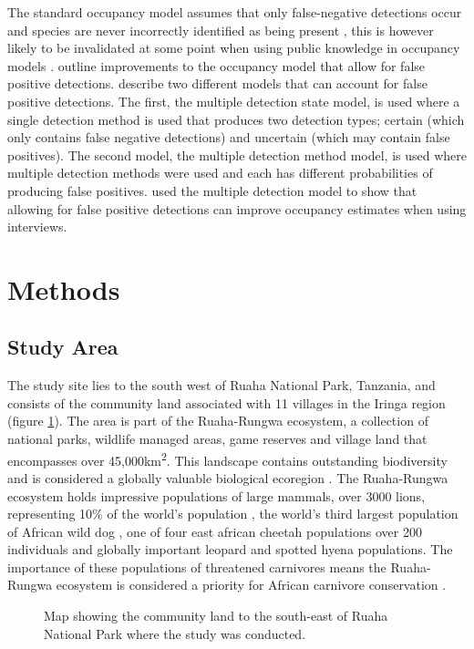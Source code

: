 The standard occupancy model assumes that only false-negative detections occur and species are never incorrectly identified as being present \cite{mackenzie2006occupancy}, this is however likely to be invalidated at some point when using public knowledge in occupancy models \cite{Pillay2014}. \citet{States2011} outline improvements to the occupancy model that allow for false positive detections. \citet{States2011} describe two different models that can account for false positive detections. The first, the multiple detection state model, is used where a single detection method is used that produces two detection types; certain (which only contains false negative detections) and uncertain (which may contain false positives). The second model, the multiple detection method model, is used where multiple detection methods were used and each has different probabilities of producing false positives. \cite{Pillay2014} used the multiple detection model to show that allowing for false positive detections can improve occupancy estimates when using interviews.

\section*{Methods}
\subsection*{Study Area}
The study site lies to the south west of Ruaha National Park, Tanzania, and consists of the community land associated with 11 villages in the Iringa region (figure \ref{fig:area_map}). The area is part of the Ruaha-Rungwa ecosystem, a collection of national parks, wildlife managed areas, game reserves and village land that encompasses over 45,000km\textsuperscript{2}. This landscape contains outstanding biodiversity and is considered a globally valuable biological ecoregion \cite{Olson1998}. The Ruaha-Rungwa ecosystem holds impressive populations of large mammals, over 3000 lions, representing 10\% of the world's population \cite{Riggio2013}, the world's third largest population of African wild dog \cite{IUCN2007}, one of four east african cheetah populations over 200 individuals \cite{IUCN2007} and globally important leopard and spotted hyena populations. The importance of these populations of threatened carnivores means the Ruaha-Rungwa ecosystem is considered a priority for African carnivore conservation \cite{Mills2001}.\\

\begin{figure}[htb]
\centering
\setlength\fboxsep{0pt}
\setlength\fboxrule{0.5pt}
\caption{Map showing the community land to the south-east of Ruaha National Park where the study was conducted.}
\label{fig:area_map}
\end{figure}

